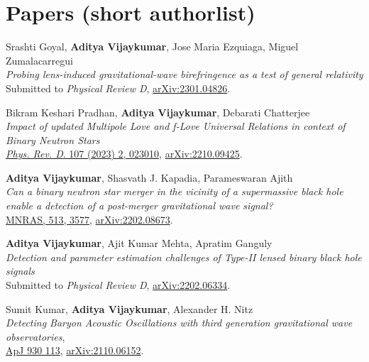     \section{Papers (short authorlist)}
\begin{etaremune}

	\item
	Srashti Goyal, \textbf{Aditya Vijaykumar}, Jose Maria Ezquiaga, Miguel Zumalacarregui \\
	\textit{Probing lens-induced gravitational-wave birefringence as a test of general relativity}\\
	Submitted to \textit{Physical Review D}, \href{https://arxiv.org/abs/2301.04826}{arXiv:2301.04826}.

    \item 
	Bikram Keshari Pradhan, \textbf{Aditya Vijaykumar}, Debarati Chatterjee \\
	\textit{Impact of updated Multipole Love and f-Love Universal Relations in context of Binary Neutron Stars}\\
	\href{https://journals.aps.org/prd/abstract/10.1103/PhysRevD.107.023010}{\textit{Phys. Rev. D}. 107 (2023) 2, 023010}, \href{https://arxiv.org/abs/2210.09425}{arXiv:2210.09425}.
 
 \item 
	\textbf{Aditya Vijaykumar}, Shasvath J. Kapadia, Parameswaran Ajith\\
	\textit{Can a binary neutron star merger in the vicinity of a supermassive black hole enable a detection of a post-merger gravitational wave signal?}\\
	\href{https://academic.oup.com/mnras/article/513/3/3577/6573885}{MNRAS, 513, 3577}, \href{https://arxiv.org/abs/2202.08673}{arXiv:2202.08673}.
	
	\item \textbf{Aditya Vijaykumar}, Ajit Kumar Mehta, Apratim Ganguly\\
	\textit{Detection and parameter estimation challenges of Type-II lensed binary black hole signals}\\
	Submitted to \textit{Physical Review D}, \href{https://arxiv.org/abs/2202.06334}{arXiv:2202.06334}.

	\item 
	Sumit Kumar, \textbf{Aditya Vijaykumar}, Alexander H. Nitz\\
	\textit{Detecting Baryon Acoustic Oscillations with third generation gravitational wave observatories},\\
	\href{https://iopscience.iop.org/article/10.3847/1538-4357/ac5e34}{ApJ 930 113}, \href{https://arxiv.org/abs/2110.06152}{arXiv:2110.06152}.


\end{etaremune}
